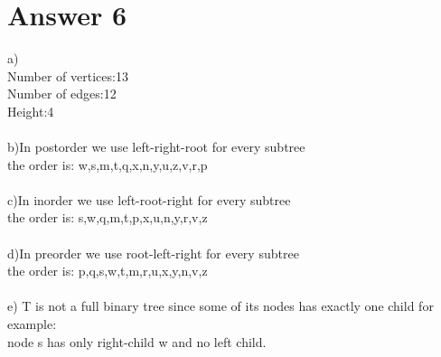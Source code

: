 \documentclass[12pt]{article}
\begin{document}
\begin{figure}[H]
	\centering
	\label{fig:g5}
\end{figure}
\section*{Answer 6}
a)\\
Number of vertices:13\\
Number of edges:12\\
Height:4\\
\\ 
b)In postorder we use left-right-root for every subtree\\
the order is: w,s,m,t,q,x,n,y,u,z,v,r,p\\
\\
c)In inorder we use left-root-right for every subtree\\
the order is: s,w,q,m,t,p,x,u,n,y,r,v,z\\
\\
d)In preorder we use root-left-right for every subtree\\
the order is: p,q,s,w,t,m,r,u,x,y,n,v,z\\
\\
e) T is not a full binary tree since some of its nodes has exactly one child for example:\\
node s has only right-child w and no left child.\\
\end{document}
